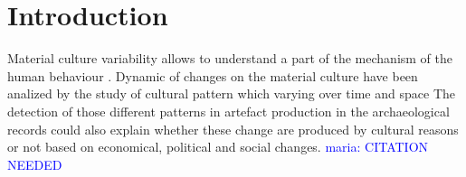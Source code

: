 \documentclass[review]{elsarticle}
\newcommand{\memo}[2]{\textcolor{#1}{#2}}
\newcommand{\maria}[1]{\memo{blue}{maria: #1\\}}
\begin{document}



\section{Introduction}

Material culture variability allows to understand a part of the mechanism of the human behaviour \citep{basalla1988evolution, schillinger_copying_2016}. Dynamic of changes on the material culture have been analized by the study of cultural pattern which varying over time and space \citep{eerkens_jelmer_cultural_2007, lycett_cultural_2015} The detection of those  different patterns in artefact production in the archaeological records could also explain whether these change are produced by cultural reasons or not based on economical, political and social changes. \maria{CITATION NEEDED}

\end{document}
